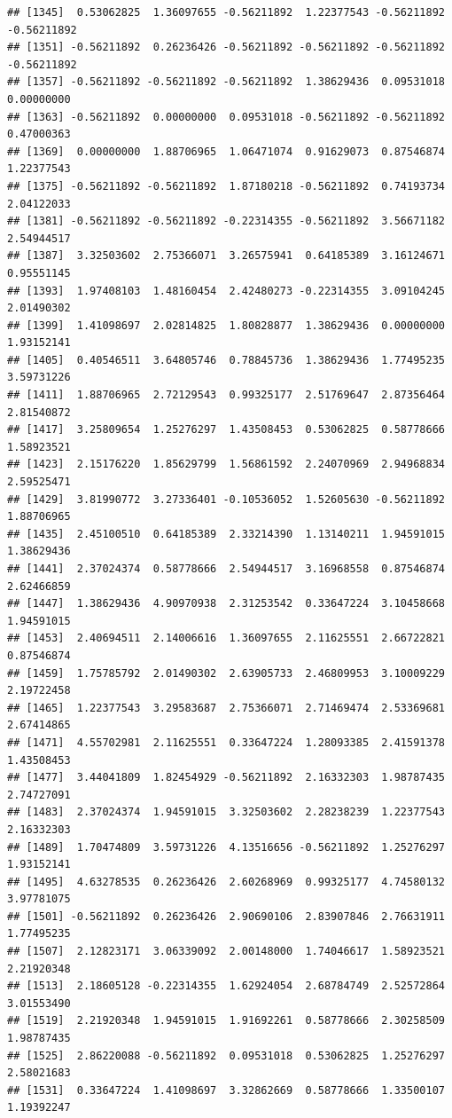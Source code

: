 \documentclass[
]{article}
\begin{document}
\begin{verbatim}
## [1345]  0.53062825  1.36097655 -0.56211892  1.22377543 -0.56211892 -0.56211892
## [1351] -0.56211892  0.26236426 -0.56211892 -0.56211892 -0.56211892 -0.56211892
## [1357] -0.56211892 -0.56211892 -0.56211892  1.38629436  0.09531018  0.00000000
## [1363] -0.56211892  0.00000000  0.09531018 -0.56211892 -0.56211892  0.47000363
## [1369]  0.00000000  1.88706965  1.06471074  0.91629073  0.87546874  1.22377543
## [1375] -0.56211892 -0.56211892  1.87180218 -0.56211892  0.74193734  2.04122033
## [1381] -0.56211892 -0.56211892 -0.22314355 -0.56211892  3.56671182  2.54944517
## [1387]  3.32503602  2.75366071  3.26575941  0.64185389  3.16124671  0.95551145
## [1393]  1.97408103  1.48160454  2.42480273 -0.22314355  3.09104245  2.01490302
## [1399]  1.41098697  2.02814825  1.80828877  1.38629436  0.00000000  1.93152141
## [1405]  0.40546511  3.64805746  0.78845736  1.38629436  1.77495235  3.59731226
## [1411]  1.88706965  2.72129543  0.99325177  2.51769647  2.87356464  2.81540872
## [1417]  3.25809654  1.25276297  1.43508453  0.53062825  0.58778666  1.58923521
## [1423]  2.15176220  1.85629799  1.56861592  2.24070969  2.94968834  2.59525471
## [1429]  3.81990772  3.27336401 -0.10536052  1.52605630 -0.56211892  1.88706965
## [1435]  2.45100510  0.64185389  2.33214390  1.13140211  1.94591015  1.38629436
## [1441]  2.37024374  0.58778666  2.54944517  3.16968558  0.87546874  2.62466859
## [1447]  1.38629436  4.90970938  2.31253542  0.33647224  3.10458668  1.94591015
## [1453]  2.40694511  2.14006616  1.36097655  2.11625551  2.66722821  0.87546874
## [1459]  1.75785792  2.01490302  2.63905733  2.46809953  3.10009229  2.19722458
## [1465]  1.22377543  3.29583687  2.75366071  2.71469474  2.53369681  2.67414865
## [1471]  4.55702981  2.11625551  0.33647224  1.28093385  2.41591378  1.43508453
## [1477]  3.44041809  1.82454929 -0.56211892  2.16332303  1.98787435  2.74727091
## [1483]  2.37024374  1.94591015  3.32503602  2.28238239  1.22377543  2.16332303
## [1489]  1.70474809  3.59731226  4.13516656 -0.56211892  1.25276297  1.93152141
## [1495]  4.63278535  0.26236426  2.60268969  0.99325177  4.74580132  3.97781075
## [1501] -0.56211892  0.26236426  2.90690106  2.83907846  2.76631911  1.77495235
## [1507]  2.12823171  3.06339092  2.00148000  1.74046617  1.58923521  2.21920348
## [1513]  2.18605128 -0.22314355  1.62924054  2.68784749  2.52572864  3.01553490
## [1519]  2.21920348  1.94591015  1.91692261  0.58778666  2.30258509  1.98787435
## [1525]  2.86220088 -0.56211892  0.09531018  0.53062825  1.25276297  2.58021683
## [1531]  0.33647224  1.41098697  3.32862669  0.58778666  1.33500107  1.19392247

\end{verbatim}
\end{document}
